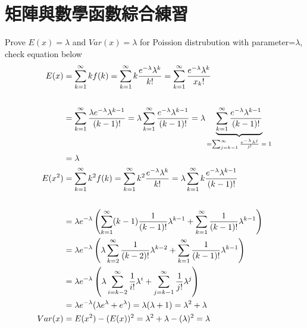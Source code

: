 \section{{矩陣與數學函數綜合練習}}
\begin{try}\;\;Prove $E(x)=\lambda$ and $Var(x)=\lambda$ for Poission distrubution with parameter=$\lambda$, check equation below
\begin{align}
 E(x) &= \sum_{k=1}^{\infty}k f(k)\notag= \sum_{k=1}^{\infty}k\frac{e^{-\lambda}\lambda^{k}}{k!}= \sum_{k=1}^{\infty}\frac{e^{-\lambda}\lambda^{k}}{x_k!}\notag\\[6mm]
      &= \sum_{k=1}^{\infty}\frac{\lambda e^{-\lambda}\lambda^{k-1}}{(k-1)!}=
      \lambda \sum_{k=1}^{\infty}\frac{e^{-\lambda}\lambda^{k-1}}{(k-1)!}=
      \lambda\underbrace{\sum_{k=1}^{\infty}\frac{e^{-\lambda}\lambda^{k-1}}{(k-1)!}}_{\text{=$\sum_{j=k-1}^{\infty}\frac{e^{-\lambda}\lambda^{j}}{j!}=1$}}\notag\\
      &= \lambda\notag\\
       E(x^2) &= \sum_{k=1}^{\infty}k^2 f(k)\notag= \sum_{k=1}^{\infty}k^2\frac{e^{-\lambda}\lambda^{k}}{k!}= \lambda\sum_{k=1}^{\infty}k\frac{e^{-\lambda}\lambda^{k-1}}{(k-1)!}\\[6mm]
     &= \lambda e^{-\lambda}\left(\sum_{k=1}^{\infty}(k-1)\frac{1}{(k-1)!}\lambda^{k-1}+\sum_{k=1}^{\infty}\frac{1}{(k-1)!}\lambda^{k-1}\right)\notag\\
&= \lambda e^{-\lambda}\left(\lambda\sum_{k=2}^{\infty}\frac{1}{(k-2)!}\lambda^{k-2}+\sum_{k=1}^{\infty}\frac{1}{(k-1)!}\lambda^{k-1}\notag\right)\\
&= \lambda e^{-\lambda}\left(\lambda\sum_{i=k-2}^{\infty}\frac{1}{i!}\lambda^i+\sum_{j=k-1}^{\infty}\frac{1}{j!}\lambda^j\notag\right)\\
&=\lambda e^{-\lambda}(\lambda e^{\lambda}+e^{\lambda})=\lambda(\lambda+1)=\lambda^2+\lambda\notag\\
Var(x)&=E(x^2)-(E(x))^2=\lambda^2+\lambda-(\lambda)^2=\lambda\notag
\end{align}
\end{try}

